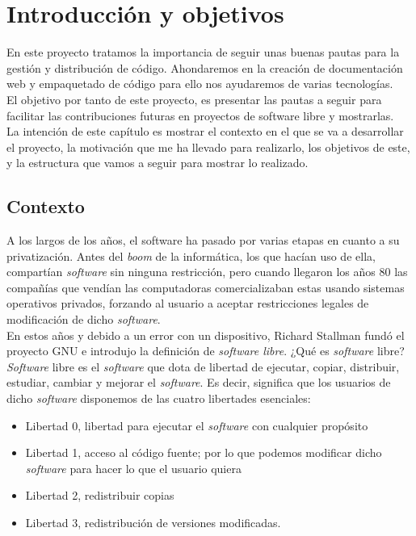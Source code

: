 \chapter{Introducción y objetivos}
\label{chap:intro}
En este proyecto tratamos la importancia de seguir unas buenas pautas para la gestión y distribución de código. Ahondaremos en la creación de documentación web y empaquetado de código para ello nos ayudaremos de varias tecnologías. \\
El objetivo por tanto de este proyecto, es presentar las pautas a seguir para facilitar las contribuciones futuras en proyectos de software libre y mostrarlas. \\
La intención de este capítulo es mostrar el contexto en el que se va a desarrollar el proyecto, la motivación que  me ha llevado para realizarlo, los objetivos de este, y la estructura que vamos a seguir para mostrar lo realizado.

\section{Contexto}
\label{sec:contex}
A los largos de los años, el software ha pasado por varias etapas en cuanto a su privatización. Antes del \emph{boom} de la informática, los que hacían uso de ella, compartían \emph{software} sin ninguna restricción, pero cuando llegaron los años 80 las compañías que vendían las computadoras comercializaban estas usando sistemas operativos privados, forzando al usuario a aceptar restricciones legales de modificación de dicho \emph{software}.\\
En estos años y debido a un error con un dispositivo, Richard Stallman fundó el proyecto GNU e introdujo la definición de \emph{software libre}. ¿Qué es \emph{software} libre? \emph{Software} libre es el \emph{software} que dota de libertad de ejecutar, copiar, distribuir, estudiar, cambiar y mejorar el \emph{software}.
\newpage
Es decir, significa que los usuarios de dicho \emph{software} disponemos de las cuatro libertades esenciales:
\begin{itemize}
    \item Libertad 0, libertad para ejecutar el \emph{software} con cualquier propósito
    \item Libertad 1, acceso al código fuente; por lo que podemos modificar dicho \emph{software} para hacer lo que el usuario quiera
    \item Libertad 2, redistribuir copias
    \item Libertad 3, redistribución de versiones modificadas.
\end{itemize}

